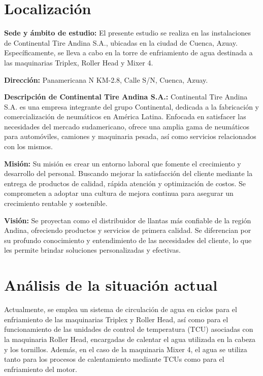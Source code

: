\documentclass[11pt]{article}
\begin{document}
    \section{Localización}

    \textbf{Sede y ámbito de estudio:} 
    El presente estudio se realiza en las instalaciones de Continental Tire Andina S.A., ubicadas
    en la ciudad de Cuenca, Azuay. Específicamente, se lleva a cabo en la torre de enfriamiento
    de agua destinada a las maquinarias Triplex, Roller Head y Mixer 4.

    \textbf{Dirección:} Panamericana N KM-2.8, Calle S/N, Cuenca, Azuay. 

    \textbf{Descripción de Continental Tire Andina S.A.:}
    Continental Tire Andina S.A. es una empresa integrante del grupo Continental, dedicada a la
    fabricación y comercialización de neumáticos en América Latina. Enfocada en satisfacer las
    necesidades del mercado sudamericano, ofrece una amplia gama de neumáticos para
    automóviles, camiones y maquinaria pesada, así como servicios relacionados con los
    mismos.

    \textbf{Misión:}
    Su misión es crear un entorno laboral que fomente el crecimiento y desarrollo del personal.
    Buscando mejorar la satisfacción del cliente mediante la entrega de productos de calidad,
    rápida atención y optimización de costos. Se comprometen a adoptar una cultura de mejora
    continua para asegurar un crecimiento rentable y sostenible.

    \textbf{Visión:}
    Se proyectan como el distribuidor de llantas más confiable de la región Andina, ofreciendo
    productos y servicios de primera calidad. Se diferencian por su profundo conocimiento y
    entendimiento de las necesidades del cliente, lo que les permite brindar soluciones
    personalizadas y efectivas.

    \section{Análisis de la situación actual}
    Actualmente, se emplea un sistema de circulación de agua en ciclos para el enfriamiento de
    las maquinarias Triplex y Roller Head, así como para el funcionamiento de las unidades de
    control de temperatura (TCU) asociadas con la maquinaria Roller Head, encargadas de
    calentar el agua utilizada en la cabeza y los tornillos. Además, en el caso de la maquinaria
    Mixer 4, el agua se utiliza tanto para los procesos de calentamiento mediante TCUs como
    para el enfriamiento del motor.
    
\end{document}
